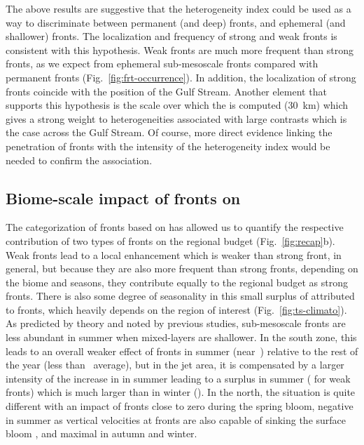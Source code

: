 The above results are suggestive that the heterogeneity index could be used as a way to discriminate between permanent (and deep) fronts, and ephemeral (and shallower) fronts.
The localization and frequency of strong and weak fronts is consistent with this hypothesis.
Weak fronts are much more frequent than strong fronts, as we expect from ephemeral sub-mesoscale fronts compared with permanent fronts (Fig.~\ref{fig:frt-occurrence}).
In addition, the localization of strong fronts coincide with the position of the Gulf Stream.
Another element that supports this hypothesis is the scale over which the  is computed (\qty{30}{\km}) which gives a strong weight to  heterogeneities associated with large contrasts which is the case across the Gulf Stream.
Of course, more direct evidence linking the penetration of fronts with the intensity of the heterogeneity index would be needed to confirm the association.

\subsection{Biome-scale impact of fronts on }

The categorization of fronts based on  has allowed us to quantify the respective contribution of two types of fronts on the regional  budget (Fig.~\ref{fig:recap}b).
Weak fronts lead to a local  enhancement which is weaker than strong front, in general, but because they are also more frequent than strong fronts, depending on the biome and seasons, they contribute equally to the regional  budget as strong fronts.
There is also some degree of seasonality in this small surplus of  attributed to fronts, which heavily depends on the region of interest (Fig.~\ref{fig:ts-climato}).
As predicted by theory and noted by previous studies, sub-mesoscale fronts  are less abundant in summer when mixed-layers are shallower.
In the south zone, this leads to an overall weaker effect of fronts in summer (near~) relative to the rest of the year (less than~ average), but in the jet area, it is compensated by a larger intensity of the increase in  in summer leading to a  surplus in summer ( for weak fronts) which is much larger than in winter ().
In the north, the situation is quite different with an impact of fronts close to zero during the spring bloom, negative in summer as vertical velocities at fronts are also capable of sinking the surface bloom \parencite{levy_2018}, and maximal in autumn and winter.

